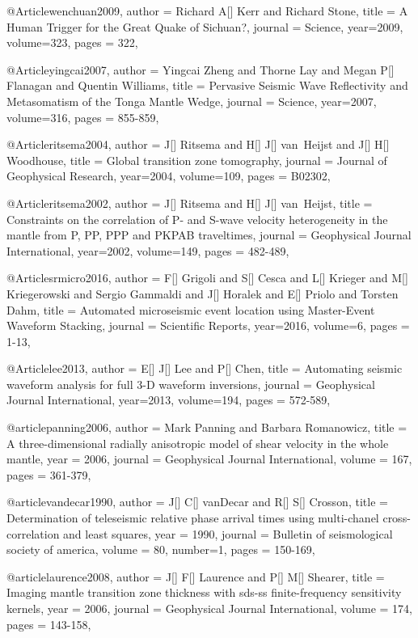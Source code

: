 @Article{wenchuan2009,
  author =	 {Richard A[] Kerr and Richard Stone},
  title =	 {A Human Trigger for the Great Quake of Sichuan?},
  journal =	 {Science},
  year=2009,
  volume=323,
  pages =	 {322},
}

@Article{yingcai2007,
  author =	 {Yingcai Zheng and Thorne Lay and Megan P[] Flanagan and Quentin Williams},
  title =	 {Pervasive Seismic Wave Reflectivity and Metasomatism of the Tonga Mantle Wedge},
  journal =	 {Science},
  year=2007,
  volume=316,
  pages =	 {855-859},
}

@Article{ritsema2004,
  author =	 {J[] Ritsema and H[] J[] van~Heijst and J[] H[] Woodhouse},
  title =	 {Global transition zone tomography},
  journal =	 {Journal of Geophysical Research},
  year=2004,
  volume=109,
  pages =	 {B02302},
}

@Article{ritsema2002,
  author =	 {J[] Ritsema and H[] J[] van~Heijst},
  title =	 {Constraints on the correlation of {P}- and {S}-wave velocity heterogeneity in the mantle from {P}, {PP}, {PPP} and {PKPAB} traveltimes},
  journal =	 {Geophysical Journal International},
  year=2002,
  volume=149,
  pages =	 {482-489},
}

@Article{srmicro2016,
  author =	 {F[] Grigoli and S[] Cesca and L[] Krieger and M[] Kriegerowski and Sergio Gammaldi and J[] Horalek and E[] Priolo and Torsten Dahm},
  title =	 {Automated microseismic event location using Master-Event Waveform Stacking},
  journal =	 {Scientific Reports},
  year=2016,
  volume=6,
  pages =	 {1-13},
}

@Article{lee2013,
  author =	 {E[] J[] Lee and P[] Chen},
  title =	 {Automating seismic waveform analysis for full 3-{D} waveform inversions},
  journal =	 {Geophysical Journal International},
  year=2013,
  volume=194,
  pages =	 {572-589},
}

@article{panning2006,
author = {Mark Panning and Barbara Romanowicz},
title = {A three-dimensional radially anisotropic model of shear velocity
in the whole mantle},
year = {2006},
journal = {Geophysical Journal International},
volume = {167},
pages = {361-379},
}

@article{vandecar1990,
author = {J[] C[] vanDecar and R[] S[] Crosson},
title = {Determination of teleseismic relative phase arrival times using multi-chanel cross-correlation and least squares},
year = {1990},
journal = {Bulletin of seismological society of america},
volume = {80},
number=1,
pages = {150-169},
}

@article{laurence2008,
author = {J[] F[] Laurence and P[] M[] Shearer},
title = {Imaging mantle transition zone thickness with sds-ss finite-frequency sensitivity kernels},
year = {2006},
journal = {Geophysical Journal International},
volume = {174},
pages = {143-158},
}




